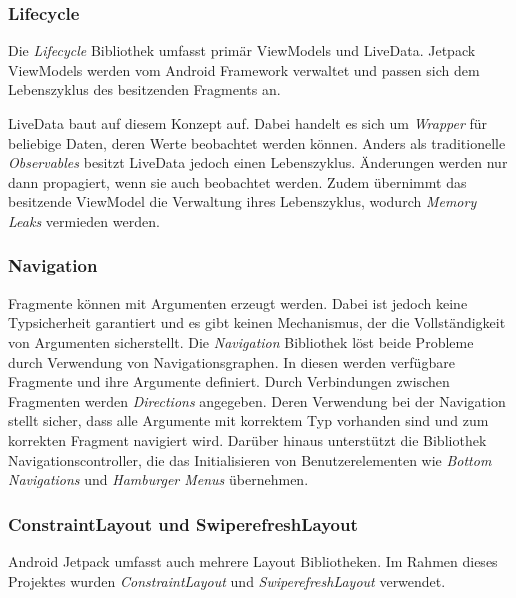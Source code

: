 \documentclass[a4paper, 11pt]{article}
\begin{document}
\subsubsection{Lifecycle}
\label{subsubsec:app:jetpack:lifecycle}
Die \textit{Lifecycle} Bibliothek umfasst primär ViewModels und LiveData.
Jetpack ViewModels werden vom Android Framework verwaltet und passen sich dem Lebenszyklus des besitzenden Fragments an.

LiveData baut auf diesem Konzept auf.
Dabei handelt es sich um \textit{Wrapper} für beliebige Daten, deren Werte beobachtet werden können.
Anders als traditionelle \textit{Observables} besitzt LiveData jedoch einen Lebenszyklus.
Änderungen werden nur dann propagiert, wenn sie auch beobachtet werden.
Zudem übernimmt das besitzende ViewModel die Verwaltung ihres Lebenszyklus, wodurch \textit{Memory Leaks} vermieden werden.

\subsubsection{Navigation}
\label{subsubsec:app:jetpack:navigation}
Fragmente können mit Argumenten erzeugt werden.
Dabei ist jedoch keine Typsicherheit garantiert und es gibt keinen Mechanismus, der die Vollständigkeit von Argumenten sicherstellt.
Die \textit{Navigation} Bibliothek löst beide Probleme durch Verwendung von Navigationsgraphen.
In diesen werden verfügbare Fragmente und ihre Argumente definiert.
Durch Verbindungen zwischen Fragmenten werden \textit{Directions} angegeben.
Deren Verwendung bei der Navigation stellt sicher, dass alle Argumente mit korrektem Typ vorhanden sind und zum korrekten Fragment navigiert wird.
Darüber hinaus unterstützt die Bibliothek Navigationscontroller, die das Initialisieren von Benutzerelementen wie \textit{Bottom Navigations} und \textit{Hamburger Menus} übernehmen. 

\subsubsection{ConstraintLayout und SwiperefreshLayout}
\label{subsubsec:app:jetpack:layouts}
Android Jetpack umfasst auch mehrere Layout Bibliotheken.
Im Rahmen dieses Projektes wurden \textit{ConstraintLayout} und \textit{SwiperefreshLayout} verwendet.
\end{document}
